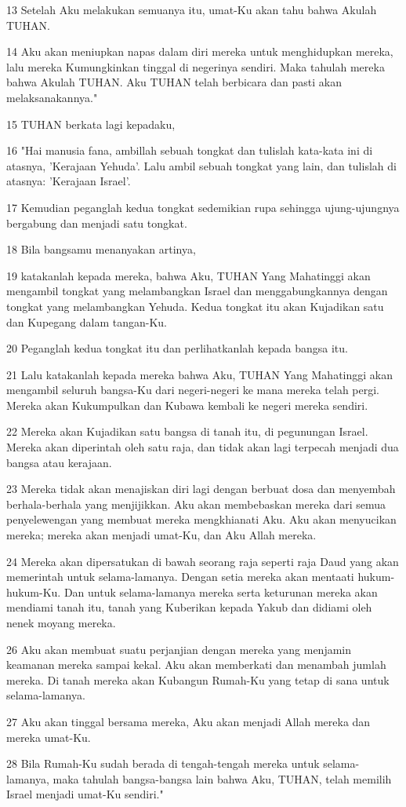 \par 13 Setelah Aku melakukan semuanya itu, umat-Ku akan tahu bahwa Akulah TUHAN.
\par 14 Aku akan meniupkan napas dalam diri mereka untuk menghidupkan mereka, lalu mereka Kumungkinkan tinggal di negerinya sendiri. Maka tahulah mereka bahwa Akulah TUHAN. Aku TUHAN telah berbicara dan pasti akan melaksanakannya."
\par 15 TUHAN berkata lagi kepadaku,
\par 16 "Hai manusia fana, ambillah sebuah tongkat dan tulislah kata-kata ini di atasnya, 'Kerajaan Yehuda'. Lalu ambil sebuah tongkat yang lain, dan tulislah di atasnya: 'Kerajaan Israel'.
\par 17 Kemudian peganglah kedua tongkat sedemikian rupa sehingga ujung-ujungnya bergabung dan menjadi satu tongkat.
\par 18 Bila bangsamu menanyakan artinya,
\par 19 katakanlah kepada mereka, bahwa Aku, TUHAN Yang Mahatinggi akan mengambil tongkat yang melambangkan Israel dan menggabungkannya dengan tongkat yang melambangkan Yehuda. Kedua tongkat itu akan Kujadikan satu dan Kupegang dalam tangan-Ku.
\par 20 Peganglah kedua tongkat itu dan perlihatkanlah kepada bangsa itu.
\par 21 Lalu katakanlah kepada mereka bahwa Aku, TUHAN Yang Mahatinggi akan mengambil seluruh bangsa-Ku dari negeri-negeri ke mana mereka telah pergi. Mereka akan Kukumpulkan dan Kubawa kembali ke negeri mereka sendiri.
\par 22 Mereka akan Kujadikan satu bangsa di tanah itu, di pegunungan Israel. Mereka akan diperintah oleh satu raja, dan tidak akan lagi terpecah menjadi dua bangsa atau kerajaan.
\par 23 Mereka tidak akan menajiskan diri lagi dengan berbuat dosa dan menyembah berhala-berhala yang menjijikkan. Aku akan membebaskan mereka dari semua penyelewengan yang membuat mereka mengkhianati Aku. Aku akan menyucikan mereka; mereka akan menjadi umat-Ku, dan Aku Allah mereka.
\par 24 Mereka akan dipersatukan di bawah seorang raja seperti raja Daud yang akan memerintah untuk selama-lamanya. Dengan setia mereka akan mentaati hukum-hukum-Ku. Dan untuk selama-lamanya mereka serta keturunan mereka akan mendiami tanah itu, tanah yang Kuberikan kepada Yakub dan didiami oleh nenek moyang mereka.
\par 26 Aku akan membuat suatu perjanjian dengan mereka yang menjamin keamanan mereka sampai kekal. Aku akan memberkati dan menambah jumlah mereka. Di tanah mereka akan Kubangun Rumah-Ku yang tetap di sana untuk selama-lamanya.
\par 27 Aku akan tinggal bersama mereka, Aku akan menjadi Allah mereka dan mereka umat-Ku.
\par 28 Bila Rumah-Ku sudah berada di tengah-tengah mereka untuk selama-lamanya, maka tahulah bangsa-bangsa lain bahwa Aku, TUHAN, telah memilih Israel menjadi umat-Ku sendiri."

